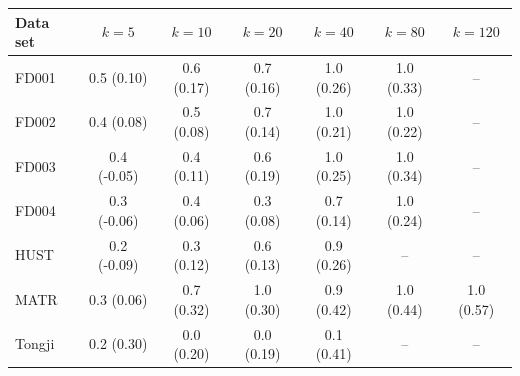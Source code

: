 \begin{tabular}{l c c c c c c }
\hline
Data set & $k=5$ & $k=10$ & $k=20$ & $k=40$ & $k=80$ & $k=120$ \\
\hline
FD001 & 0.5 (0.10) & 0.6 (0.17) & 0.7 (0.16) & 1.0 (0.26) & 1.0 (0.33) & -- \\
FD002 & 0.4 (0.08) & 0.5 (0.08) & 0.7 (0.14) & 1.0 (0.21) & 1.0 (0.22) & -- \\
FD003 & 0.4 (-0.05) & 0.4 (0.11) & 0.6 (0.19) & 1.0 (0.25) & 1.0 (0.34) & -- \\
FD004 & 0.3 (-0.06) & 0.4 (0.06) & 0.3 (0.08) & 0.7 (0.14) & 1.0 (0.24) & -- \\
HUST & 0.2 (-0.09) & 0.3 (0.12) & 0.6 (0.13) & 0.9 (0.26) & -- & -- \\
MATR & 0.3 (0.06) & 0.7 (0.32) & 1.0 (0.30) & 0.9 (0.42) & 1.0 (0.44) & 1.0 (0.57) \\
Tongji & 0.2 (0.30) & 0.0 (0.20) & 0.0 (0.19) & 0.1 (0.41) & -- & -- \\
\hline
\end{tabular}
